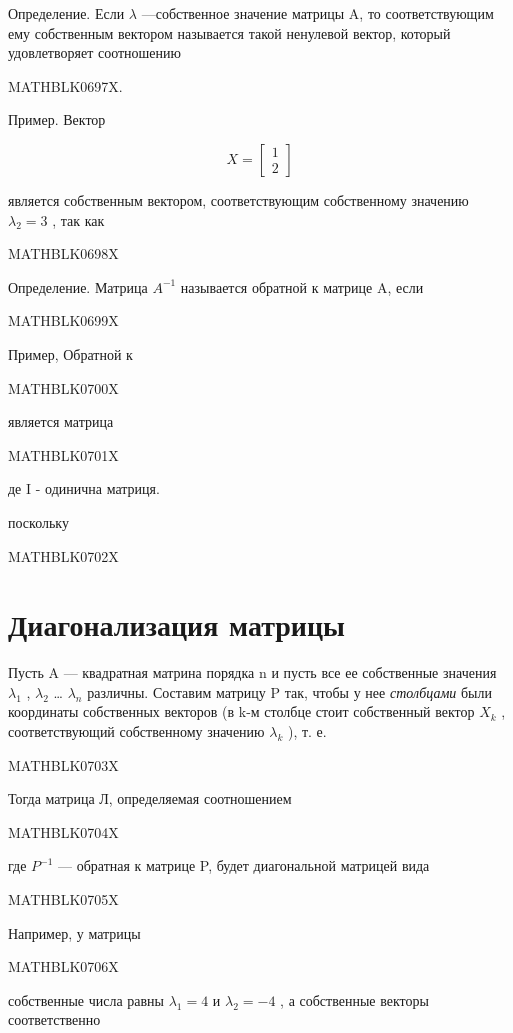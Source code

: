 \documentclass[
  ukrainian,
]{article}
\begin{document}
Определение. Если \(\lambda\) ---собственное значение матрицы A, то
соответствующим ему собственным вектором называется такой ненулевой
вектор, который удовлетворяет соотношению

MATHBLK0697X.

Пример. Вектор

\[
X = \begin{bmatrix} 1 \\ 2 \end{bmatrix}
\]

является собственным вектором, соответствующим собственному значению
\(\lambda_2 = 3\) , так как

MATHBLK0698X

Определение. Матрица \(A^{-1}\) называется обратной к матрице A, если

MATHBLK0699X

Пример, Обратной к

MATHBLK0700X

является матрица

MATHBLK0701X

де I - одинична матриця.

поскольку

MATHBLK0702X

\section{Диагонализация
матрицы}\label{ux434ux438ux430ux433ux43eux43dux430ux43bux438ux437ux430ux446ux438ux44f-ux43cux430ux442ux440ux438ux446ux44b-1}

Пусть A --- квадратная матрина порядка n и пусть все ее собственные
значения \(\lambda_1\) , \(\lambda_2\) \ldots{} \(\lambda_n\) различны.
Составим матрицу P так, чтобы у нее \emph{столбцами} были координаты
собственных векторов (в k-м столбце стоит собственный вектор \(X_k\) ,
соответствующий собственному значению \(\lambda_k\) ), т. е.

MATHBLK0703X

Тогда матрица Л, определяемая соотношением

MATHBLK0704X

где \(P^{-1}\) --- обратная к матрице P, будет диагональной матрицей
вида

MATHBLK0705X

Например, у матрицы

MATHBLK0706X

собственные числа равны \(\lambda_1 = 4\) и \(\lambda_2 = -4\) , а
собственные векторы соответственно
\end{document}
